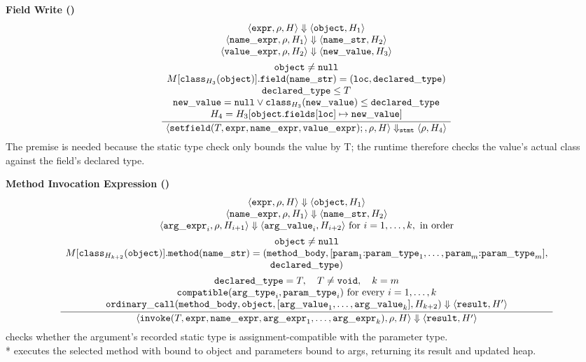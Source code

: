 \textbf{Field Write ()}
\[
\dfrac{\begin{array}{c}
  \langle \mathtt{expr}, \rho, H\rangle \Downarrow \langle \mathtt{object}, H_1\rangle \\
  \langle \mathtt{name\_expr}, \rho, H_1\rangle \Downarrow \langle \mathtt{name\_str}, H_2\rangle \\
  \langle \mathtt{value\_expr}, \rho, H_2\rangle \Downarrow \langle \mathtt{new\_value}, H_3\rangle \\[1ex]
  \mathtt{object} \neq \mathtt{null} \\
  M[\mathtt{class}_{H_3}(\mathtt{object})].\mathtt{field}(\mathtt{name\_str}) = (\mathtt{loc}, \mathtt{declared\_type}) \\
  \mathtt{declared\_type} \le T \\
  \mathtt{new\_value} = \mathtt{null} \lor \mathtt{class}_{H_3}(\mathtt{new\_value}) \le \mathtt{declared\_type} \\
  H_4 = H_3[\mathtt{object}.\mathtt{fields}[\mathtt{loc}] \mapsto \mathtt{new\_value}]
\end{array}}{
  \langle \mathtt{setfield}(T, \mathtt{expr}, \mathtt{name\_expr}, \mathtt{value\_expr});, \rho, H\rangle
  \Downarrow_{\mathtt{stmt}} \langle \rho, H_4\rangle
}
\]
{\small *The \textbf{} premise is needed because the static type
check only bounds the value by T; the runtime therefore checks the value's
actual class against the field's declared type.}

\textbf{Method Invocation Expression ()}
\[
\dfrac{\begin{array}{c}
  \langle \mathtt{expr}, \rho, H\rangle \Downarrow \langle \mathtt{object}, H_1\rangle \\
  \langle \mathtt{name\_expr}, \rho, H_1\rangle \Downarrow \langle \mathtt{name\_str}, H_2\rangle \\
  \langle \mathtt{arg\_expr}_i, \rho, H_{i+1}\rangle \Downarrow \langle \mathtt{arg\_value}_i, H_{i+2}\rangle
    \text{ for } i = 1, \ldots, k, \text{ in order} \\[1ex]
  \mathtt{object} \neq \mathtt{null} \\
  M[\mathtt{class}_{H_{k+2}}(\mathtt{object})].\mathtt{method}(\mathtt{name\_str}) =
    (\mathtt{method\_body}, [\mathtt{param}_1{:}\mathtt{param\_type}_1, \ldots, \mathtt{param}_m{:}\mathtt{param\_type}_m], \\
    \mathtt{declared\_type}) \\[1ex]
  \mathtt{declared\_type} = T, \quad T \neq \mathtt{void}, \quad k = m \\
  \mathtt{compatible}(\mathtt{arg\_type}_i, \mathtt{param\_type}_i) \text{ for every } i = 1, \ldots, k \\
  \mathtt{ordinary\_call}(\mathtt{method\_body}, \mathtt{object}, [\mathtt{arg\_value}_1, \ldots, \mathtt{arg\_value}_k], H_{k+2})
    \Downarrow \langle \mathtt{result}, H'\rangle
\end{array}}{
  \langle \mathtt{invoke}(T, \mathtt{expr}, \mathtt{name\_expr}, \mathtt{arg\_expr}_1, \ldots, \mathtt{arg\_expr}_k), \rho, H\rangle
  \Downarrow \langle \mathtt{result}, H'\rangle
}
\]
{\small *\textbf{} checks whether the
argument's recorded static type is assignment-compatible with the parameter
type.\\
*\textbf{} executes the
selected method with  bound to object and parameters bound to args,
returning its result and updated heap.}

